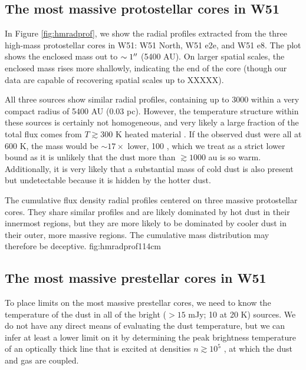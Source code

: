 \documentclass{aa}
\begin{document}
\subsection{The most massive protostellar cores in W51}
In Figure \ref{fig:hmradprof}, we show the radial profiles extracted from the
three high-mass protostellar cores in W51: W51 North, W51 e2e, and W51 e8.
The plot shows the enclosed mass out to $\sim1\mbox{$^{\prime\prime}$}$ (5400 AU).  On larger
spatial scales, the enclosed mass rises more shallowly, indicating the end of the
core (though our data are capable of recovering spatial scales up to XXXXX).

All three sources show similar radial profiles, containing up to 3000 \msun
within a very compact radius of 5400 AU (0.03 pc).  However, the temperature
structure within these sources is certainly not homogeneous, and very likely a
large fraction of the total flux comes from $T\gtrsim300$ K heated material
\citep[Section \ref{sec:temperature}][]{Goddi2016a}.  If the observed dust were
all at 600 K, the mass would be $\sim17\times$ lower, 100 \msun, which we treat
as a strict lower bound as it is unlikely that the dust more than $\gtrsim1000$
au is so warm.  Additionally, it is very likely that a substantial mass of cold
dust is also present but undetectable because it is hidden by the hotter dust.

{The cumulative flux density radial profiles centered on three
massive protostellar cores.  They share similar profiles and
are likely dominated by hot dust in their innermost regions,
but they are more likely to be dominated by cooler dust in their
outer, more massive regions.  The cumulative mass distribution may
therefore be deceptive.}
{fig:hmradprof}{1}{14cm}

\subsection{The most massive prestellar cores in W51}
To place limits on the most massive prestellar cores, we need to know the
temperature of the dust in all of the bright ($>15$ mJy; 10 \msun at 20 K)
sources.  We do not have any direct means of evaluating the dust temperature,
but we can infer at
least a lower limit on it by determining the peak brightness temperature of an
optically thick line that is excited at densities $n\gtrsim10^5$ \percc, at
which the dust and gas are coupled.
\end{document}
